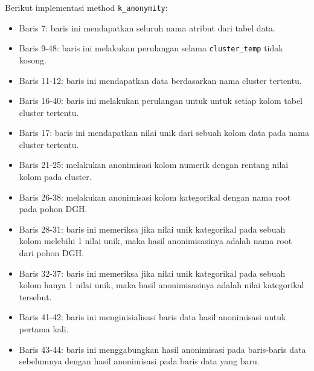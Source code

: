 \noindent Berikut implementasi method \texttt{k\_anonymity}:

\vspace{0.2cm}
\begin{itemize}
\item Baris 7: baris ini mendapatkan seluruh nama atribut dari tabel data.
\item Baris 9-48: baris ini melakukan perulangan selama \texttt{cluster\_temp} tidak kosong. 
\item Baris 11-12: baris ini mendapatkan data berdasarkan nama cluster tertentu.
\item Baris 16-40: baris ini melakukan perulangan untuk untuk setiap kolom tabel cluster tertentu.
\item Baris 17: baris ini mendapatkan nilai unik dari sebuah kolom data pada nama cluster tertentu.
\item Baris 21-25: melakukan anonimisasi kolom numerik dengan rentang nilai kolom pada cluster.
\item Baris 26-38: melakukan anonimisasi kolom kategorikal dengan nama root pada pohon DGH.
\item Baris 28-31: baris ini memeriksa jika nilai unik kategorikal pada sebuah kolom melebihi 1 nilai unik, maka hasil anonimisasinya adalah nama root dari pohon DGH.
\item Baris 32-37: baris ini memeriksa jika nilai unik kategorikal pada sebuah kolom hanya 1 nilai unik, maka hasil anonimisasinya adalah nilai kategorikal tersebut.
\item Baris 41-42: baris ini menginisialisasi baris data hasil anonimisasi untuk pertama kali.
\item Baris 43-44: baris ini menggabungkan hasil anonimisasi pada baris-baris data sebelumnya dengan hasil anonimisasi pada baris data yang baru.
\end{itemize}


